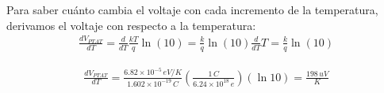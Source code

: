 \documentclass{article}
\begin{document}
\noindent Para saber cuánto cambia el voltaje con cada incremento de la temperatura, derivamos el voltaje con respecto a la temperatura:
\begin{align}
	\frac{dV_{PTAT}}{dT} = \frac{d}{dT}\frac{kT}{q}\ln(10) = \frac{k}{q}\ln(10)\frac{d}{dT}T= \frac{k}{q}\ln(10)\nonumber
\end{align}

\begin{align}
	\frac{dV_{PTAT}}{dT} = \frac{6.82 \times 10^{-5} \, eV/K}{1.602 \times 10^{-19} \, C}\left( \frac{1 \, C}{6.24 \times 10^{18} \, e} \right)(\ln10) = \frac{198 \, uV}{K}
\end{align}
\end{document}
